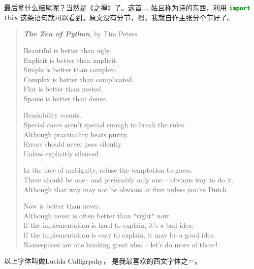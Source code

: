 \documentclass[a4paper,12pt]{report}
\newcommand{\pyline}[1]{{ \lstinline[language=Python, basicstyle=\ttfamily]{#1} }}
\newcommand{\python}{{\ttfamily{Python}}}
\newcommand{\dpar}{\\ \mbox{}}	%
\newcommand{\qd}[1]{{\bfseries{#1}}}	%
\begin{document}
最后拿什么结尾呢？当然是《\python 之禅》了。这首……姑且称为诗的东西，利用\pyline{import this}这条语句就可以看到。原文没有分节，嗯，我就自作主张分个节好了。
\begin{verse}

\qd{\itshape{The Zen of Python}}, by Tim Peters\dpar
\lucida %

Beautiful is better than ugly.\\
Explicit is better than implicit.\\
Simple is better than complex.\\
Complex is better than complicated.\\
Flat is better than nested.\\
Sparse is better than dense.\dpar

Readability counts.\\
Special cases aren't special enough to break the rules.\\
Although practicality beats purity.\\
Errors should never pass silently.\\
Unless explicitly silenced.\dpar

In the face of ambiguity, refuse the temptation to guess.\\
There should be one-- and preferably only one -- obvious way to do it.\\
Although that way may not be obvious at first unless you're Dutch.\dpar

Now is better than never.\\
Although never is often better than *right* now.\\
If the implementation is hard to explain, it's a bad idea.\\
If the implementation is easy to explain, it may be a good idea.\\
Namespaces are one honking great idea -- let's do more of those!
\end{verse}

以上字体叫做{\lucida Lucida Calligrpahy}， 是我最喜欢的西文字体之一。

\begin{center}
\Large
{}
\end{center}
\end{document}
